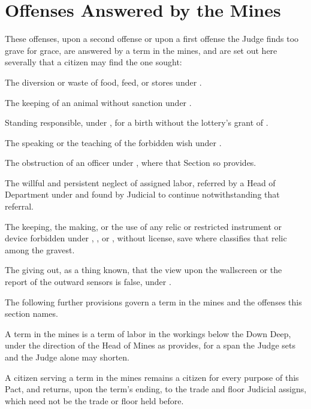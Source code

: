 \section{Offenses Answered by the Mines}
\label{sec:crimes:offenses-answered-by-the-mines}

These offenses, upon a second offense or upon a first offense the Judge finds too grave for grace, are answered by a term in the mines, and are set out here severally that a citizen may find the one sought:

\begin{clauses}
\item The diversion or waste of food, feed, or stores under .
\item The keeping of an animal without sanction under .
\item Standing responsible, under , for a birth without the lottery's grant of .
\item The speaking or the teaching of the forbidden wish under .
\item The obstruction of an officer under , where that Section so provides.
\item The willful and persistent neglect of assigned labor, referred by a Head of Department under  and found by Judicial to continue notwithstanding that referral.
\item The keeping, the making, or the use of any relic or restricted instrument or device forbidden under , , or , without license, save where  classifies that relic among the gravest.
\item The giving out, as a thing known, that the view upon the wallscreen or the report of the outward sensors is false, under .
\end{clauses}

The following further provisions govern a term in the mines and the offenses this section names.

\begin{clauses}
\setcounter{enumi}{8}
\item A term in the mines is a term of labor in the workings below the Down Deep, under the direction of the Head of Mines as  provides, for a span the Judge sets and the Judge alone may shorten.
\item A citizen serving a term in the mines remains a citizen for every purpose of this Pact, and returns, upon the term's ending, to the trade and floor Judicial assigns, which need not be the trade or floor held before.
\end{clauses}

